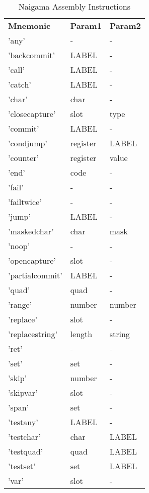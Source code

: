 
\begin{table}[]
\centering
\caption{Naigama Assembly Instructions}
\label{tab:naig_assembly}
\begin{tabular}{lll}
\textbf{Mnemonic} & \textbf{Param1} & \textbf{Param2} \\
'any' & - & - \\
'backcommit' & LABEL & - \\
'call' & LABEL & - \\
'catch' & LABEL & - \\
'char' & char & - \\
'closecapture' & slot & type \\
'commit' & LABEL & - \\
'condjump' & register & LABEL \\
'counter' & register & value \\
'end' & code & - \\
'fail' & - & - \\
'failtwice' & - & - \\
'jump' & LABEL & - \\
'maskedchar' & char & mask \\
'noop' & - & - \\
'opencapture' & slot & - \\
'partialcommit' & LABEL & - \\
'quad' & quad & - \\
'range' & number & number \\
'replace' & slot & - \\
'replacestring' & length & string \\
'ret' & - & - \\
'set' & set & - \\
'skip' & number & - \\
'skipvar' & slot & - \\
'span' & set & - \\
'testany' & LABEL & - \\
'testchar' & char & LABEL \\
'testquad' & quad & LABEL \\
'testset' & set & LABEL \\
'var' & slot & - \\
\end{tabular}
\end{table}
